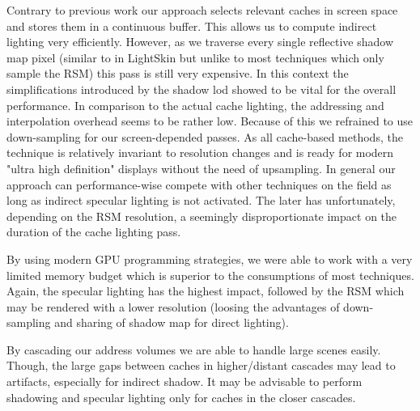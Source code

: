 \documentclass[thesis.tex]{subfiles}
\begin{document}
Contrary to previous work our approach selects relevant caches in screen space and stores them in a continuous buffer.
This allows us to compute indirect lighting very efficiently.
However, as we traverse every single reflective shadow map pixel (similar to in LightSkin \cite{bib:LightskinPaper} but unlike to most techniques which only sample the RSM) this pass is still very expensive.
In this context the simplifications introduced by the shadow lod showed to be vital for the overall performance.
In comparison to the actual cache lighting, the addressing and interpolation overhead seems to be rather low.
Because of this we refrained to use down-sampling for our screen-depended passes.
As all cache-based methods, the technique is relatively invariant to resolution changes and is ready for modern "ultra  high definition" displays without the need of upsampling.
In general our approach can performance-wise compete with other techniques on the field as long as indirect specular lighting is not activated.
The later has unfortunately, depending on the RSM resolution, a seemingly disproportionate impact on the duration of the cache lighting pass.

By using modern GPU programming strategies, we were able to work with a very limited memory budget which is superior to the consumptions of most techniques.
Again, the specular lighting has the highest impact, followed by the RSM which may be rendered with a lower resolution (loosing the advantages of down-sampling and sharing of shadow map for direct lighting).

By cascading our address volumes we are able to handle large scenes easily.
Though, the large gaps between caches in higher/distant cascades may lead to artifacts, especially for indirect shadow.
It may be advisable to perform shadowing and specular lighting only for caches in the closer cascades.
\end{document}
